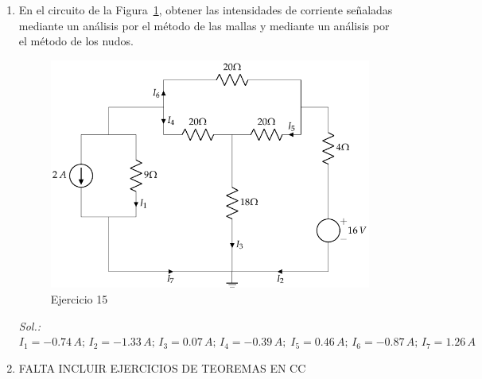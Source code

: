 \documentclass[11pt]{book} %
\begin{document}
\begin{enumerate}
\item En el circuito de la Figura~\ref{fig.ej12_BT1}, obtener las intensidades de
corriente señaladas mediante un análisis por el método de
las mallas y mediante un análisis por el método de los nudos.
\begin{figure}[H]
    \centering
    \includegraphics{../figs/ej12_BT1.pdf}
    \caption{Ejercicio 15}
    \label{fig.ej12_BT1}
\end{figure}

\emph{Sol.: $I_1=-0.74\,A;\,I_2=-1.33\,A;\,I_3=0.07\,A;\,I_4=-0.39\,A;\;I_5=0.46\,A;\,I_6=-0.87\,A;\,I_7=1.26\,A$}

\item FALTA INCLUIR EJERCICIOS DE TEOREMAS EN CC





\end{enumerate}
\end{document}
